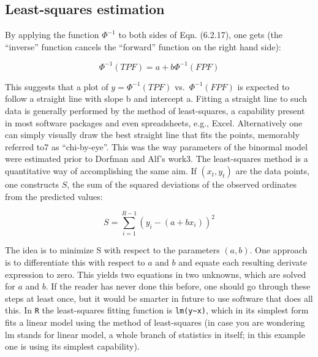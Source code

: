 \documentclass[
]{book}
\begin{document}
\hypertarget{least-squares-estimation}{%
\subsection{Least-squares estimation}\label{least-squares-estimation}}

By applying the function \(\Phi^{-1}\) to both sides of Eqn. (6.2.17), one gets (the ``inverse'' function cancels the ``forward'' function on the right hand side):

\begin{equation*} 
\Phi^{-1}\left ( TPF \right ) = a + b \Phi^{-1}\left ( FPF \right )
\end{equation*}

This suggests that a plot of \(y = \Phi^{-1}\left ( TPF \right )\) vs.~\(\Phi^{-1}\left ( FPF \right )\) is expected to follow a straight line with slope b and intercept a. Fitting a straight line to such data is generally performed by the method of least-squares, a capability present in most software packages and even spreadsheets, e.g., Excel. Alternatively one can simply visually draw the best straight line that fits the points, memorably referred to7 as ``chi-by-eye''. This was the way parameters of the binormal model were estimated prior to Dorfman and Alf's work3. The least-squares method is a quantitative way of accomplishing the same aim. If \(\left ( x_t,y_t \right )\) are the data points, one constructs \(S\), the sum of the squared deviations of the observed ordinates from the predicted values:

\begin{equation*} 
S  = \sum_{i=1}^{R-1}\left ( y_i - \left ( a + bx_i \right ) \right )^2
\end{equation*}

The idea is to minimize S with respect to the parameters \((a,b)\). One approach is to differentiate this with respect to \(a\) and \(b\) and equate each resulting derivate expression to zero. This yields two equations in two unknowns, which are solved for \(a\) and \(b\). If the reader has never done this before, one should go through these steps at least once, but it would be smarter in future to use software that does all this. In \texttt{R} the least-squares fitting function is \texttt{lm(y\textasciitilde{}x)}, which in its simplest form fits a linear model using the method of least-squares (in case you are wondering lm stands for linear model, a whole branch of statistics in itself; in this example one is using its simplest capability).
\end{document}
